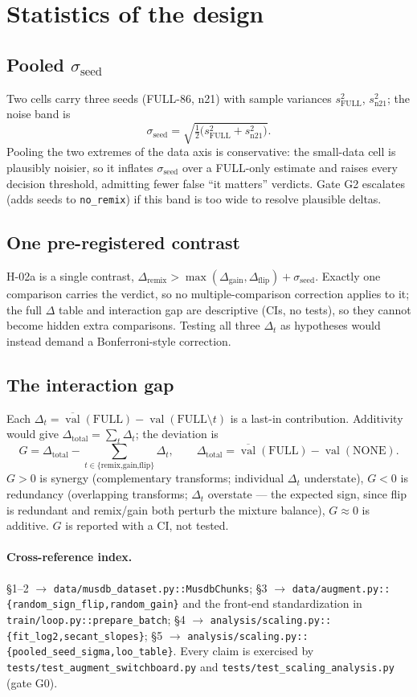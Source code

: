 \documentclass[11pt]{article}
\newcommand{\code}[1]{\texttt{#1}}
\newcommand{\val}{\operatorname{val}}
\begin{document}
\section{Statistics of the design}

\subsection{Pooled $\sigma_{\text{seed}}$}

Two cells carry three seeds (FULL-86, n21) with sample variances $s^2_{\text{FULL}}$,
$s^2_{\text{n21}}$; the noise band is
\[
\sigma_{\text{seed}}=\sqrt{\tfrac12\big(s^2_{\text{FULL}}+s^2_{\text{n21}}\big)}.
\]
Pooling the two extremes of the data axis is conservative: the small-data cell is
plausibly noisier, so it inflates $\sigma_{\text{seed}}$ over a FULL-only estimate and
raises every decision threshold, admitting fewer false ``it matters'' verdicts. Gate
G2 escalates (adds seeds to \code{no\_remix}) if this band is too wide to resolve
plausible deltas.

\subsection{One pre-registered contrast}

H-02a is a single contrast,
$\Delta_{\text{remix}}>\max(\Delta_{\text{gain}},\Delta_{\text{flip}})+\sigma_{\text{seed}}$.
Exactly one comparison carries the verdict, so no multiple-comparison correction
applies to it; the full $\Delta$ table and interaction gap are descriptive (CIs, no
tests), so they cannot become hidden extra comparisons. Testing all three $\Delta_t$
as hypotheses would instead demand a Bonferroni-style correction.

\subsection{The interaction gap}

Each $\Delta_t=\overline{\val}(\text{FULL})-\val(\text{FULL}\setminus t)$ is a last-in
contribution. Additivity would give $\Delta_{\text{total}}=\sum_t\Delta_t$; the
deviation is
\[
G=\Delta_{\text{total}}-\!\!\sum_{t\in\{\text{remix,gain,flip}\}}\!\!\Delta_t,\qquad
\Delta_{\text{total}}=\overline{\val}(\text{FULL})-\val(\text{NONE}).
\]
$G>0$ is synergy (complementary transforms; individual $\Delta_t$ understate),
$G<0$ is redundancy (overlapping transforms; $\Delta_t$ overstate --- the expected
sign, since flip is redundant and remix/gain both perturb the mixture balance),
$G\approx0$ is additive. $G$ is reported with a CI, not tested.

\paragraph{Cross-reference index.} \S1--2 $\to$
\code{data/musdb\_dataset.py::MusdbChunks}; \S3 $\to$
\code{data/augment.py::\{random\_sign\_flip,random\_gain\}} and the front-end
standardization in \code{train/loop.py::prepare\_batch}; \S4 $\to$
\code{analysis/scaling.py::\{fit\_log2,secant\_slopes\}}; \S5 $\to$
\code{analysis/scaling.py::\{pooled\_seed\_sigma,loo\_table\}}. Every claim is
exercised by \code{tests/test\_augment\_switchboard.py} and
\code{tests/test\_scaling\_analysis.py} (gate G0).
\end{document}
